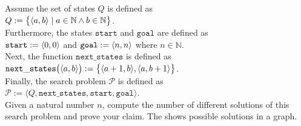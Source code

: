 \exercise
Assume the set of states $Q$ is defined as
\\[0.2cm]
\hspace*{1.3cm}
$Q := \bigl\{ \pair(a, b) \mid a \in \mathbb{N} \wedge b \in \mathbb{N} \bigr\}$.
\\[0.2cm]
Furthermore, the states $\texttt{start}$ and $\texttt{goal}$ are defined as
\\[0.2cm]
\hspace*{1.3cm}
$\mathtt{start} := \pair(0,0)$ \quad and \quad $\mathtt{goal} := \pair(n,n)$ where $n \in \mathbb{N}$.
\\[0.2cm]
Next, the function $\texttt{next\_states}$ is defined as
\\[0.2cm]
\hspace*{1.3cm}
$\mathtt{next\_states}\bigl(\pair(a,b)\bigr) := \bigl\{\pair(a+1,b), \pair(a,b+1)\bigr\}$.
\\[0.2cm]
Finally, the search problem $\mathcal{P}$ is defined as
\\[0.2cm]
\hspace*{1.3cm}
$\mathcal{P} := \langle Q, \mathtt{next\_states}, \mathtt{start}, \mathtt{goal} \rangle$.
\\[0.2cm]
Given a natural number $n$, compute the number of different solutions of this search problem and prove
your claim.  The  shows possible solutions in a graph.


